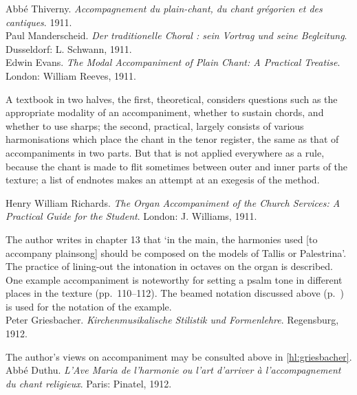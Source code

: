     \parindent=0pt
    \hangindent=0pt
  \covid{}Abbé Thiverny. \emph{Accompagnement du plain-chant, du chant grégorien et des cantiques}. 1911. \\

    \parindent=0pt
    \hangindent=0pt
  \covid{}Paul Manderscheid. \emph{Der traditionelle Choral : sein Vortrag und seine Begleitung}. Dusseldorf:  L. Schwann, 1911. \\

    \parindent=0pt
    \hangindent=0pt
  Edwin Evans. \emph{The Modal Accompaniment of Plain Chant: A Practical Treatise}. London:  William Reeves, 1911.

     \parindent=20pt
     \hangindent=20pt
     A textbook in two halves, the first, theoretical, considers questions such as the appropriate modality of an accompaniment, whether to sustain chords, and whether to use sharps; the second, practical, largely consists of various harmonisations which place the chant in the tenor register, the same as that of accompaniments in two parts. But that is not applied everywhere as a rule, because the chant is made to flit sometimes between outer and inner parts of the texture; a list of endnotes makes an attempt at an exegesis of the method.\\\pagebreak{}

    \parindent=0pt
    \hangindent=0pt
  Henry William Richards. \emph{The Organ Accompaniment of the Church Services: A Practical Guide for the Student}. London:  J. Williams, 1911.

     \parindent=20pt
     \hangindent=20pt
     The author writes in chapter 13 that `in the main, the harmonies used [to accompany plainsong] should be composed on the models of Tallis or Palestrina'. The practice of lining-out the intonation in octaves on the organ is described. One example accompaniment is noteworthy for setting a psalm tone in different places in the texture (pp.~110--112). The beamed notation discussed above (p.~\pageref{ln:novello_notation}) is used for the notation of the example.\\

    \parindent=0pt
    \hangindent=0pt
  Peter Griesbacher. \emph{Kirchenmusikalische Stilistik und Formenlehre}. Regensburg, 1912.

     \parindent=20pt
     \hangindent=20pt
     The author's views on accompaniment may be consulted above in \cref{hl:griesbacher}.\\

    \parindent=0pt
    \hangindent=0pt
  \covid{}Abbé Duthu. \emph{L'Ave Maria de l'harmonie ou l'art d'arriver à l'accompagnement du chant religieux}. Paris:  Pinatel, 1912. \\

